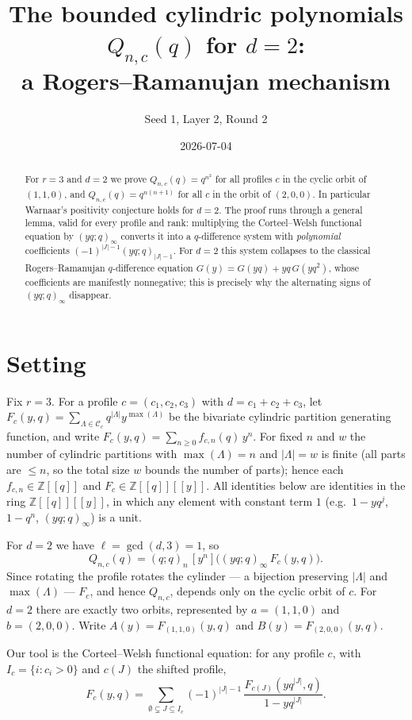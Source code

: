 \documentclass[11pt]{article}
\title{The bounded cylindric polynomials $Q_{n,c}(q)$ for $d=2$:\\
a Rogers--Ramanujan mechanism}
\author{Seed 1, Layer 2, Round 2}
\date{2026-07-04}
\begin{document}
\maketitle

\begin{abstract}
For $r=3$ and $d=2$ we prove $Q_{n,c}(q)=q^{n^2}$ for all profiles $c$ in the
cyclic orbit of $(1,1,0)$, and $Q_{n,c}(q)=q^{n(n+1)}$ for all $c$ in the orbit
of $(2,0,0)$. In particular Warnaar's positivity conjecture holds for $d=2$.
The proof runs through a general lemma, valid for every profile and rank:
multiplying the Corteel--Welsh functional equation by $(yq;q)_\infty$ converts
it into a $q$-difference system with \emph{polynomial} coefficients
$(-1)^{|J|-1}(yq;q)_{|J|-1}$. For $d=2$ this system collapses to the classical
Rogers--Ramanujan $q$-difference equation $G(y)=G(yq)+yq\,G(yq^2)$, whose
coefficients are manifestly nonnegative; this is precisely why the alternating
signs of $(yq;q)_\infty$ disappear.
\end{abstract}

\section{Setting}

Fix $r=3$. For a profile $c=(c_1,c_2,c_3)$ with $d=c_1+c_2+c_3$, let
$F_c(y,q)=\sum_{\Lambda\in\mathcal C_c}q^{|\Lambda|}y^{\max(\Lambda)}$ be the
bivariate cylindric partition generating function, and write
$F_c(y,q)=\sum_{n\ge0}f_{c,n}(q)\,y^n$. For fixed $n$ and $w$ the number of
cylindric partitions with $\max(\Lambda)=n$ and $|\Lambda|=w$ is finite (all
parts are $\le n$, so the total size $w$ bounds the number of parts); hence
each $f_{c,n}\in\mathbb Z[[q]]$ and $F_c\in\mathbb Z[[q]][[y]]$. All identities
below are identities in the ring $\mathbb Z[[q]][[y]]$, in which any element
with constant term $1$ (e.g.\ $1-yq^j$, $1-q^n$, $(yq;q)_\infty$) is a unit.

For $d=2$ we have $\ell=\gcd(d,3)=1$, so
\[
Q_{n,c}(q)=(q;q)_n\,[y^n]\bigl((yq;q)_\infty\,F_c(y,q)\bigr).
\]
Since rotating the profile rotates the cylinder --- a bijection preserving
$|\Lambda|$ and $\max(\Lambda)$ --- $F_c$, and hence $Q_{n,c}$, depends only on
the cyclic orbit of $c$. For $d=2$ there are exactly two orbits, represented
by $a=(1,1,0)$ and $b=(2,0,0)$. Write $A(y)=F_{(1,1,0)}(y,q)$ and
$B(y)=F_{(2,0,0)}(y,q)$.

Our tool is the Corteel--Welsh functional equation: for any profile $c$, with
$I_c=\{i:c_i>0\}$ and $c(J)$ the shifted profile,
\begin{equation}\label{eq:CW}
F_c(y,q)=\sum_{\emptyset\subsetneq J\subseteq I_c}(-1)^{|J|-1}\,
\frac{F_{c(J)}(yq^{|J|},q)}{1-yq^{|J|}}.
\end{equation}
\end{document}
